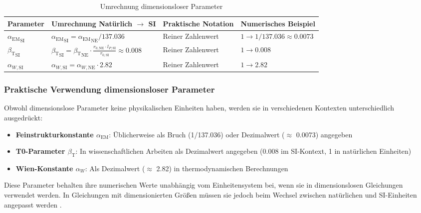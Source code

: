 \documentclass[12pt,a4paper]{article}
\newcommand{\alphaEM}{\alpha_{\text{EM}}}
\newcommand{\betaT}{\beta_{\text{T}}}
\begin{document}
	\begin{table}[ht]
		\centering
		\begin{adjustbox}{scale=0.85}
			\begin{tabular}{llll}
				\hline
				\textbf{Parameter} & \textbf{Umrechnung Natürlich $\to$ SI} & \textbf{Praktische Notation} & \textbf{Numerisches Beispiel} \\
				\hline
				${\alphaEM}_{\text{SI}}$ & ${\alphaEM}_{\text{SI}} = {\alphaEM}_{\text{NE}}/137.036$ & Reiner Zahlenwert & $1 \to 1/137.036 \approx 0.0073$ \\
				${\betaT}_{\text{SI}}$ & ${\betaT}_{\text{SI}} = {\betaT}_{\text{NE}} \cdot \frac{r_{0,\text{NE}}\cdot l_{P,\text{SI}}}{r_{0,\text{SI}}} \approx 0.008$ & Reiner Zahlenwert & $1 \to 0.008$ \\
				$\alpha_{W,\text{SI}}$ & $\alpha_{W,\text{SI}} = \alpha_{W,\text{NE}} \cdot 2.82$ & Reiner Zahlenwert & $1 \to 2.82$ \\
				\hline
			\end{tabular}
		\end{adjustbox}
		\caption{Umrechnung dimensionsloser Parameter}
		\label{tab:dimensionless_conversion}
	\end{table}
	
	\subsubsection{Praktische Verwendung dimensionsloser Parameter}
	
	Obwohl dimensionslose Parameter keine physikalischen Einheiten haben, werden sie in verschiedenen Kontexten unterschiedlich ausgedrückt:
	
	\begin{itemize}
		\item \textbf{Feinstrukturkonstante $\alphaEM$}: Üblicherweise als Bruch (1/137.036) oder Dezimalwert ($\approx$ 0.0073) angegeben
		\item \textbf{T0-Parameter $\betaT$}: In wissenschaftlichen Arbeiten als Dezimalwert angegeben (0.008 im SI-Kontext, 1 in natürlichen Einheiten)
		\item \textbf{Wien-Konstante $\alpha_W$}: Als Dezimalwert ($\approx$ 2.82) in thermodynamischen Berechnungen
	\end{itemize}
	
	Diese Parameter behalten ihre numerischen Werte unabhängig vom Einheitensystem bei, wenn sie in dimensionslosen Gleichungen verwendet werden. In Gleichungen mit dimensionierten Größen müssen sie jedoch beim Wechsel zwischen natürlichen und SI-Einheiten angepasst werden \cite{pascher_alpha_2025, pascher_beta_2025}.
	
\end{document}
